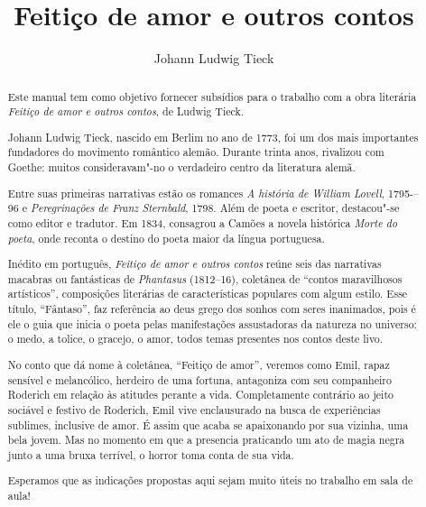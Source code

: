 \documentclass[12pt]{extarticle}
\begin{document}
\newcommand{\AutorLivro}{Johann Ludwig Tieck}
\newcommand{\TituloLivro}{Feitiço de amor e outros contos}
\newcommand{\Tema}{Ficção, mistério e fantasia}
\newcommand{\Genero}{Conto, crônica e novela}
\newcommand{\imagemCapa}{./images/PNLD0041-01.png}
\newcommand{\issnppub}{978-65-994422-3-0}
\newcommand{\issnepub}{978-65-994422-0-9}
\newcommand{\colaborador}{{Michelle Etienne Florence, Bruno Gradella e Vicente Castro}}


\title{\TituloLivro}
\author{\AutorLivro}
\def\authornotes{\colaborador}

\date{}
\maketitle


\begin{abstract}
Este manual tem como objetivo fornecer subsídios para o trabalho com a
obra literária \emph{Feitiço de amor e outros contos}, de Ludwig Tieck.

Johann Ludwig Tieck, nascido em Berlim no ano de 1773, foi um dos mais 
importantes fundadores do movimento romântico alemão. Durante trinta anos, 
rivalizou com Goethe: muitos consideravam"-no o verdadeiro centro da
literatura alemã. 

Entre suas primeiras narrativas estão os romances \emph{A história de William 
Lovell}, 1795-–96 e \emph{Peregrinações de Franz Sternbald}, 1798. Além de poeta 
e escritor, destacou"-se como editor e tradutor. Em 1834, consagrou a Camões
a novela histórica \emph{Morte do poeta}, onde reconta o destino do poeta 
maior da língua portuguesa. 

Inédito em português, \textit{Feitiço de amor e outros contos} reúne seis das 
narrativas macabras ou fantásticas de \textit{Phantasus} (1812--16), coletânea 
de ``contos maravilhosos artísticos'', composições literárias de características 
populares com algum estilo. Esse título, ``Fântaso'', faz referência ao deus grego 
dos sonhos com seres inanimados, pois é ele o guia que inicia o poeta pelas
manifestações assustadoras da natureza no universo: o medo, a tolice, o gracejo, 
o amor, todos temas presentes nos contos deste livo. 

No conto que dá nome à coletânea, ``Feitiço de amor'', veremos como Emil, rapaz
sensível e melancólico, herdeiro de uma fortuna, antagoniza com seu companheiro 
Roderich em relação às atitudes perante a vida. Completamente contrário ao jeito
sociável e festivo de Roderich, Emil vive enclausurado na busca de experiências 
sublimes, inclusive de amor. É assim que acaba se apaixonando por sua vizinha, 
uma bela jovem. Mas no momento em que a presencia praticando um ato de magia negra
junto a uma bruxa terrível, o horror toma conta de sua vida. 

Esperamos que as indicações propostas aqui sejam muito úteis no trabalho em
sala de aula! 

\end{abstract}
\end{document}
